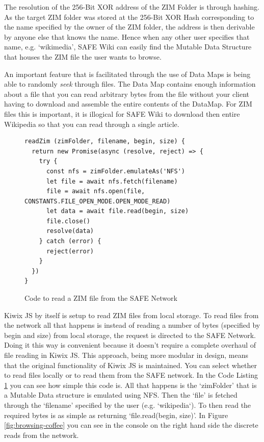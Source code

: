 The resolution of the 256-Bit XOR address of the ZIM Folder is through hashing. As the target ZIM folder was stored at the 256-Bit XOR Hash corresponding to the name specified by the owner of the ZIM folder, the address is then derivable by anyone else that knows the name. Hence when any other user specifies that name, e.g. `wikimedia', SAFE Wiki can easily find the Mutable Data Structure that houses the ZIM file the user wants to browse.
 
An important feature that is facilitated through the use of Data Maps is being able to randomly \textit{seek} through files. The Data Map contains enough information about a file that you can read arbitrary bytes from the file without your client having to download and assemble the entire contents of the DataMap. For ZIM files this is important, it is illogical for SAFE Wiki to download then entire Wikipedia so that you can read through a single article. 

\begin{figure}[h]
\begin{lstlisting}[frame=single]
readZim (zimFolder, filename, begin, size) {
  return new Promise(async (resolve, reject) => {
    try {
      const nfs = zimFolder.emulateAs('NFS')
      let file = await nfs.fetch(filename)
      file = await nfs.open(file, CONSTANTS.FILE_OPEN_MODE.OPEN_MODE_READ)
      let data = await file.read(begin, size)
      file.close()
      resolve(data)
    } catch (error) {
      reject(error)
    }
  })
}
\end{lstlisting}
\caption{Code to read a ZIM file from the SAFE Network}
\label{fig:zim-read-code}
\end{figure}

Kiwix JS by itself is setup to read ZIM files from local storage. To read files from the network all that happens is instead of reading a number of bytes (specified by begin and size) from local storage, the request is directed to the SAFE Network. Doing it this way is convenient because it doesn't require a complete overhaul of file reading in Kiwix JS. This approach, being more modular in design, means that the original functionality of Kiwix JS is maintained. You can select whether to read files locally or to read them from the SAFE network. In the Code Listing \ref{fig:zim-read-code} you can see how simple this code is. All that happens is the `zimFolder' that is a Mutable Data structure is emulated using NFS. Then the `file' is fetched through the `filename' specified by the user (e.g. `wikipedia`). To then read the required bytes is as simple as returning `file.read(begin, size)'. In Figure \ref{fig:browsing-coffee} you can see in the console on the right hand side the discrete reads from the network.

